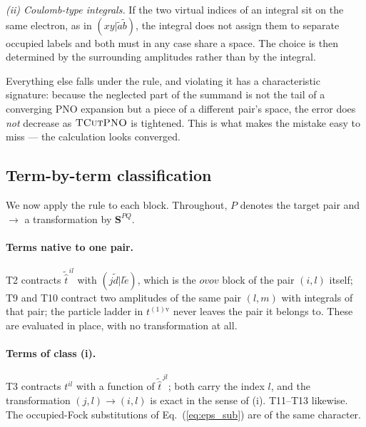 \documentclass[aip,jcp,amsmath,amssymb,preprint,superscriptaddress]{revtex4-2}%
\newcommand{\pao}[1]{\tilde{#1}}
\newcommand{\TCut}[1]{\textsc{TCut#1}}
\begin{document}
\emph{(ii) Coulomb-type integrals.} If the two virtual indices of an integral
sit on the same electron, as in $(xy|\pao{a}\pao{b})$, the integral does not
assign them to separate occupied labels and both must in any case share a
space. The choice is then determined by the surrounding amplitudes rather than
by the integral.

Everything else falls under the rule, and violating it has a characteristic
signature: because the neglected part of the summand is not the tail of a
converging PNO expansion but a piece of a different pair's space, the error
does \emph{not} decrease as $\TCut{PNO}$ is tightened. This is what makes the
mistake easy to miss --- the calculation looks converged.

\subsection{Term-by-term classification}

We now apply the rule to each block. Throughout, $P$ denotes the target pair
and $\rightarrow$ a transformation by $\mathbf{S}^{PQ}$.

\paragraph{Terms native to one pair.}
T2 contracts $\tilde{\hat{t}}^{\,il}$ with $(j\pao{d}|l\pao{e})$, which is the
$ovov$ block of the pair $(i,l)$ itself; T9 and T10 contract two amplitudes of
the same pair $(l,m)$ with integrals of that pair; the particle ladder in
$t^{(1)\text{v}}$ never leaves the pair it belongs to. These are evaluated in
place, with no transformation at all.

\paragraph{Terms of class (i).}
T3 contracts $t^{il}$ with a function of $\tilde{\hat{t}}^{\,jl}$; both carry
the index $l$, and the transformation $(j,l)\rightarrow(i,l)$ is exact in the
sense of (i). T11--T13 likewise. The occupied-Fock substitutions of
Eq.~(\ref{eq:eps_sub}) are of the same character.
\end{document}
